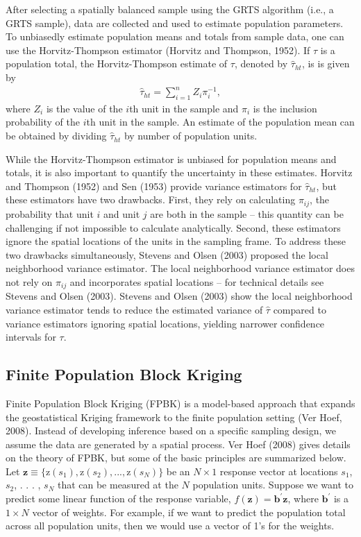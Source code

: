 \documentclass[]{elsarticle} %
\begin{document}
After selecting a spatially balanced sample using the GRTS algorithm
(i.e., a GRTS sample), data are collected and used to estimate
population parameters. To unbiasedly estimate population means and
totals from sample data, one can use the Horvitz-Thompson estimator
(Horvitz and Thompson, 1952). If \(\tau\) is a population total, the
Horvitz-Thompson estimate of \(\tau\), denoted by \(\hat{\tau}_{ht}\),
is is given by \begin{align}\label{eq:ht}
  \hat{\tau}_{ht} = \sum_{i = 1}^n Z_i \pi_i^{-1},
\end{align} where \(Z_i\) is the value of the \(i\)th unit in the sample
and \(\pi_i\) is the inclusion probability of the \(i\)th unit in the
sample. An estimate of the population mean can be obtained by dividing
\(\hat{\tau}_{ht}\) by number of population units.

While the Horvitz-Thompson estimator is unbiased for population means
and totals, it is also important to quantify the uncertainty in these
estimates. Horvitz and Thompson (1952) and Sen (1953) provide variance
estimators for \(\hat{\tau}_{ht}\), but these estimators have two
drawbacks. First, they rely on calculating \(\pi_{ij}\), the probability
that unit \(i\) and unit \(j\) are both in the sample -- this quantity
can be challenging if not impossible to calculate analytically. Second,
these estimators ignore the spatial locations of the units in the
sampling frame. To address these two drawbacks simultaneously, Stevens
and Olsen (2003) proposed the local neighborhood variance estimator. The
local neighborhood variance estimator does not rely on \(\pi_{ij}\) and
incorporates spatial locations -- for technical details see Stevens and
Olsen (2003). Stevens and Olsen (2003) show the local neighborhood
variance estimator tends to reduce the estimated variance of
\(\hat{\tau}\) compared to variance estimators ignoring spatial
locations, yielding narrower confidence intervals for \(\tau\).

\hypertarget{finite-population-block-kriging}{%
\subsection{Finite Population Block
Kriging}\label{finite-population-block-kriging}}

Finite Population Block Kriging (FPBK) is a model-based approach that
expands the geostatistical Kriging framework to the finite population
setting (Ver Hoef, 2008). Instead of developing inference based on a
specific sampling design, we assume the data are generated by a spatial
process. Ver Hoef (2008) gives details on the theory of FPBK, but some
of the basic principles are summarized below. Let
\({\mathbf{z} \equiv \{\text{z}(s_1), \text{z}(s_2), . . . , \text{z}(s_N) \}}\)
be an \(N \times 1\) response vector at locations \(s_1\), \(s_2\), . .
. , \(s_N\) that can be measured at the \(N\) population units. Suppose
we want to predict some linear function of the response variable,
\(f(\mathbf{z}) = \mathbf{b}^\prime \mathbf{z}\), where
\(\mathbf{b}^\prime\) is a \(1 \times N\) vector of weights. For
example, if we want to predict the population total across all
population units, then we would use a vector of 1's for the weights.
\end{document}
